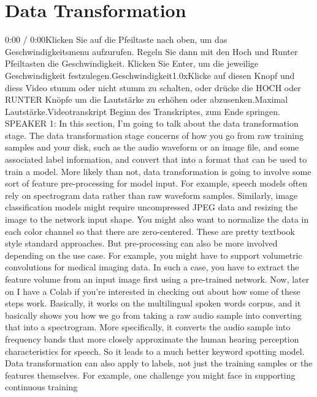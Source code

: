 {{{{\section{Data Transformation}

    0:00 / 0:00Klicken Sie auf die Pfeiltaste nach oben, um das Geschwindigkeitsmenu aufzurufen. Regeln Sie dann mit den Hoch und Runter Pfeiltasten die Geschwindigkeit. Klicken Sie Enter, um die jeweilige Geschwindigkeit festzulegen.Geschwindigkeit1.0xKlicke auf diesen Knopf und diess Video stumm oder nicht stumm zu schalten, oder drücke die HOCH oder RUNTER Knöpfe um die Lautstärke zu erhöhen oder abzusenken.Maximal Lautstärke.Videotranskript
    Beginn des Transkriptes, zum Ende springen.
    SPEAKER 1: In this section, I'm going to talk about the data transformation
    stage.
    The data transformation stage concerns of how
    you go from raw training samples and your disk,
    such as the audio waveform or an image file,
    and some associated label information, and convert that into a format that
    can be used to train a model.
    More likely than not, data transformation
    is going to involve some sort of feature pre-processing for model input.
    For example, speech models often rely on spectrogram data rather than
    raw waveform samples.
    Similarly, image classification models might
    require uncompressed JPEG data and resizing the image to the network input
    shape.
    You might also want to normalize the data in each color channel
    so that there are zero-centered.
    These are pretty textbook style standard approaches.
    But pre-processing can also be more involved depending on the use case.
    For example, you might have to support volumetric convolutions
    for medical imaging data.
    In such a case, you have to extract the feature volume from an input image
    first using a pre-trained network.
    Now, later on I have a Colab if you're interested in checking out
    about how some of these steps work.
    Basically, it works on the multilingual spoken words corpus,
    and it basically shows you how we go from taking
    a raw audio sample into converting that into a spectrogram.
    More specifically, it converts the audio sample
    into frequency bands that more closely approximate the human hearing
    perception characteristics for speech.
    So it leads to a much better keyword spotting model.
    Data transformation can also apply to labels, not just the training
    samples or the features themselves.
    For example, one challenge you might face in supporting continuous training
}}}}
